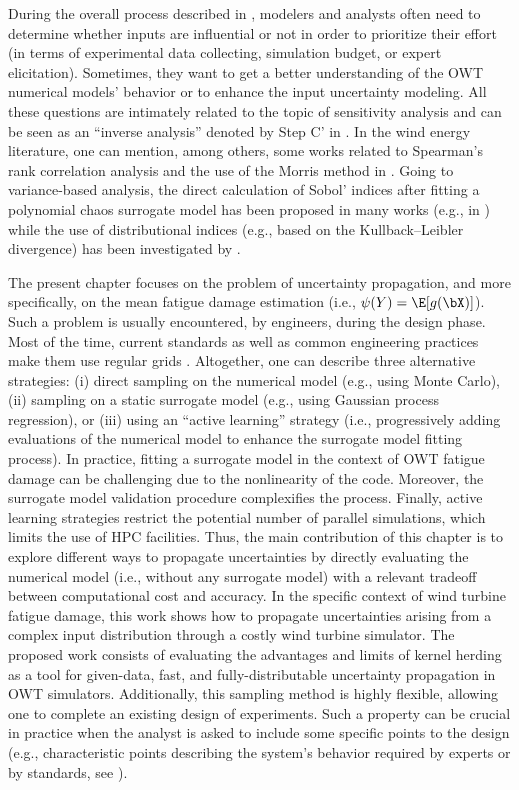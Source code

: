 During the overall process described in , modelers and analysts often need to determine whether inputs are influential or not in order to prioritize their effort (in terms of experimental data collecting, simulation budget, or expert elicitation). 
Sometimes, they want to get a better understanding of the OWT numerical models' behavior or to enhance the input uncertainty modeling. 
All these questions are intimately related to the topic of sensitivity analysis \citep{saltelli_2008,daveiga_iooss_2021} and can be seen as an ``inverse analysis'' denoted by Step C' in . 
In the wind energy literature, one can mention, among others, some works related to Spearman's rank correlation analysis and the use of the Morris method in \cite{verlade_kramhoft_2019,petrovska_2022}. 
Going to variance-based analysis, the direct calculation of Sobol' indices after fitting a polynomial chaos surrogate model has been proposed in many works (e.g., in \citealp{murcia_dimitrov_2018}) while the use of distributional indices (e.g., based on the Kullback–Leibler divergence) has been investigated by \citet{teixeira_2019}. 
 
The present chapter focuses on the problem of uncertainty propagation, and more specifically, on the mean fatigue damage estimation (i.e., $\psi(Y) = \E[g(\bX)]$). 
Such a problem is usually encountered, by engineers, during the design phase. 
Most of the time, current standards as well as common engineering practices make them use regular grids \citep{huchet_2019}. 
Altogether, one can describe three alternative strategies: (i) direct sampling on the numerical model (e.g., using Monte Carlo), (ii) sampling on a static surrogate model (e.g., using Gaussian process regression), or (iii) using an ``active learning'' strategy (i.e., progressively adding evaluations of the numerical model to enhance the surrogate model fitting process). 
In practice, fitting a surrogate model in the context of OWT fatigue damage can be challenging due to the nonlinearity of the code. 
Moreover, the surrogate model validation procedure complexifies the process. 
Finally, active learning strategies restrict the potential number of parallel simulations, which limits the use of HPC facilities. 
Thus, the main contribution of this chapter is to explore different ways to propagate uncertainties by directly evaluating the numerical model (i.e., without any surrogate model) with a relevant tradeoff between computational cost and accuracy. 
In the specific context of wind turbine fatigue damage, this work shows how to propagate uncertainties arising from a complex input distribution through a costly wind turbine simulator. 
The proposed work consists of evaluating the advantages and limits of kernel herding as a tool for given-data, fast, and fully-distributable uncertainty propagation in OWT simulators. 
Additionally, this sampling method is highly flexible, allowing one to complete an existing design of experiments. 
Such a property can be crucial in practice when the analyst is asked to include some specific points to the design (e.g., characteristic points describing the system's behavior required by experts or by standards, see \citealp{huchet_2019}). 

